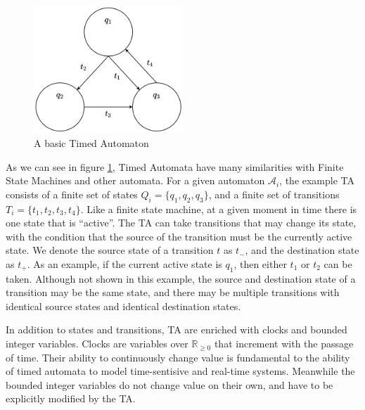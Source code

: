 \documentclass[a4paper,12pt]{article}
\begin{document}
%    
\begin{figure}[h]
  \centering
  \includegraphics[width=0.5\textwidth]{minTA-blank}
  \caption{A basic Timed Automaton}
  \label{fig:example-blank}
\end{figure}

As we can see in figure \ref{fig:example-blank}, Timed Automata have many
similarities with Finite State Machines and other automata. For a given
automaton $\mathcal{A}_{i}$, the example TA consists of a finite set of states
$Q_{i} = \{q_{1},q_{2},q_{3}\}$, and a finite set of transitions
$T_{i} = \{t_{1},t_{2},t_{3},t_{4}\}$. Like a finite state machine, at a given
moment in time there is one state that is ``active''. The TA can take
transitions that may change its state, with the condition that the source of the
transition must be the currently active state. We denote the source state of a
transition $t$ as $t_{-}$, and the destination state as $t_{+}$. As an example,
if the current active state is $q_{1}$, then either $t_{1}$ or $t_{2}$ can be
taken. Although not shown in this example, the source and destination state of a
transition may be the same state, and there may be multiple transitions with
identical source states and identical destination states.

In addition to states and transitions, TA are enriched with clocks and bounded
integer variables. Clocks are variables over $\mathbb{R}_{\geq 0}$ that increment with the
passage of time. Their ability to continuously change value is fundamental to
the ability of timed automata to model time-sentisive and real-time systems.
Meanwhile the bounded integer variables do not change value on their own, and
have to be explicitly modified by the TA.
\end{document}

